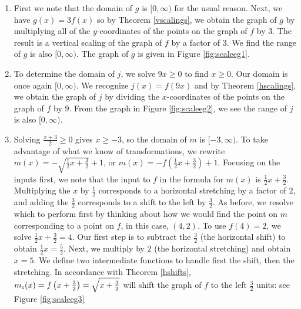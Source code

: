 {
\begin{enumerate}

\item  First we note that the domain of $g$ is $[0, \infty)$ for the usual reason.  Next, we have $g(x) = 3 f(x)$ so by Theorem \ref{vscalings}, we obtain the graph of $g$ by multiplying all of the $y$-coordinates of the points on the graph of $f$ by $3$.  The result is a vertical scaling of the graph of $f$ by a factor of $3$.  We find the range of $g$ is also $[0, \infty)$. The graph of $g$ is given in Figure \ref{fig:scaleeg1}.



\item  To determine the domain of $j$, we solve $9x \geq 0$ to find $x \geq 0$. Our domain is once again $[0,\infty)$.   We recognize $j(x) = f(9x)$ and by Theorem \ref{hscalings}, we obtain the graph of $j$ by dividing the $x$-coordinates of the points on the graph of $f$ by $9$.  From the graph in Figure \ref{fig:scaleeg2}, we see the range of $j$ is also $[0,\infty)$.



\item  Solving $\frac{x+3}{2} \geq 0$ gives $x \geq -3$, so the domain of $m$ is $[-3, \infty)$.  To take advantage of what we know of transformations, we rewrite $m(x) = - \sqrt{\frac{1}{2} x + \frac{3}{2}} + 1$, or $m(x) =- f\left(\frac{1}{2} x + \frac{3}{2}\right) + 1$.   Focusing on the inputs first, we note that the input to $f$ in the formula for $m(x)$ is $\frac{1}{2} x + \frac{3}{2}$.  Multiplying the $x$ by $\frac{1}{2}$ corresponds to a horizontal stretching by a factor of $2$, and adding the $\frac{3}{2}$ corresponds to a shift to the left by $\frac{3}{2}$.  As before, we resolve which to perform first by thinking about how we would find the point on $m$ corresponding to a point on $f$, in this case, $(4,2)$.  To use $f(4) = 2$, we solve $\frac{1}{2} x + \frac{3}{2} = 4$.  Our first step is to subtract the $\frac{3}{2}$ (the horizontal shift) to obtain $\frac{1}{2} x = \frac{5}{2}$.  Next, we multiply by $2$ (the horizontal stretching) and obtain $x = 5$.  We define two intermediate functions to handle first the shift, then the stretching.  In accordance with Theorem \ref{hshifts},  $m_{\mbox{\tiny$1$}}(x) = f\left(x+ \frac{3}{2}\right) = \sqrt{x+\frac{3}{2}}$ will shift the graph of $f$ to the left $\frac{3}{2}$ units: see Figure \ref{fig:scaleeg3}


\end{enumerate}}
